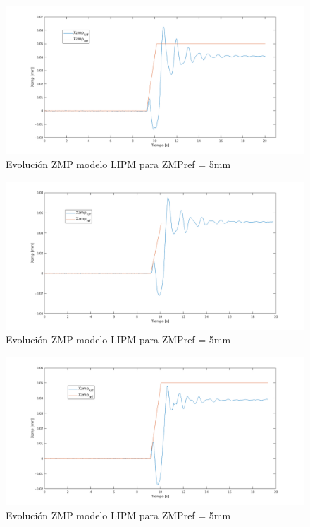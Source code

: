 \begin{figure}[H]
\centering
\includegraphics[scale=0.45]{imagenes/apartado_5/5.1/55}
\caption{Evolución ZMP modelo LIPM para ZMPref = 5mm}
\label{figura55}
\end{figure}

\begin{figure}[H]
\centering
\includegraphics[scale=0.45]{imagenes/apartado_5/5.1/56}
\caption{Evolución ZMP modelo LIPM para ZMPref = 5mm}
\label{figura56}
\end{figure}

\begin{figure}[H]
\centering
\includegraphics[scale=0.45]{imagenes/apartado_5/5.1/57}
\caption{Evolución ZMP modelo LIPM para ZMPref = 5mm}
\label{figura57}
\end{figure}

